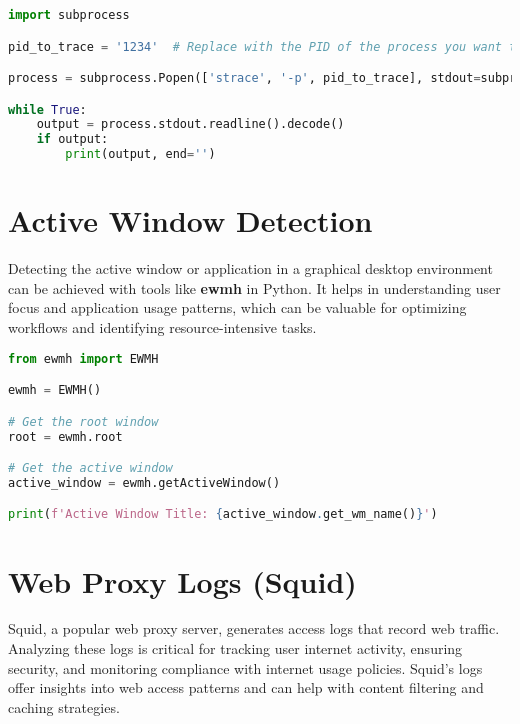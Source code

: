 \documentclass{VUMIFPSmagistrinis}
\begin{document}
\begin{lstlisting}[language=Python]
import subprocess

pid_to_trace = '1234'  # Replace with the PID of the process you want to trace

process = subprocess.Popen(['strace', '-p', pid_to_trace], stdout=subprocess.PIPE, stderr=subprocess.PIPE)

while True:
    output = process.stdout.readline().decode()
    if output:
        print(output, end='')
\end{lstlisting}

\section{Active Window Detection}
Detecting the active window or application in a graphical desktop environment can be achieved with tools like \textbf{ewmh} in Python. It helps in understanding user focus and application usage patterns, which can be valuable for optimizing workflows and identifying resource-intensive tasks.

\begin{lstlisting}[language=Python]
from ewmh import EWMH

ewmh = EWMH()

# Get the root window
root = ewmh.root

# Get the active window
active_window = ewmh.getActiveWindow()

print(f'Active Window Title: {active_window.get_wm_name()}')
\end{lstlisting}

\section{Web Proxy Logs (Squid)}
Squid, a popular web proxy server, generates access logs that record web traffic. Analyzing these logs is critical for tracking user internet activity, ensuring security, and monitoring compliance with internet usage policies. Squid's logs offer insights into web access patterns and can help with content filtering and caching strategies.
\end{document}
